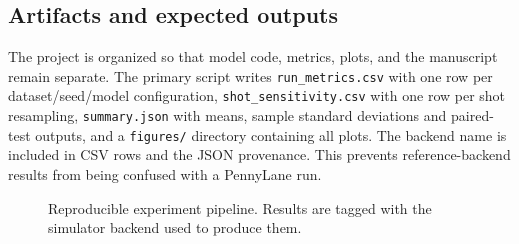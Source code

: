 \subsection{Artifacts and expected outputs}
The project is organized so that model code, metrics, plots, and the manuscript remain separate. The primary script writes \texttt{run\_metrics.csv} with one row per dataset/seed/model configuration, \texttt{shot\_sensitivity.csv} with one row per shot resampling, \texttt{summary.json} with means, sample standard deviations and paired-test outputs, and a \texttt{figures/} directory containing all plots. The backend name is included in CSV rows and the JSON provenance. This prevents reference-backend results from being confused with a PennyLane run.

\begin{figure}[!htbp]
\centering
{}
\caption{Reproducible experiment pipeline. Results are tagged with the simulator backend used to produce them.}
\label{fig:pipeline}
\end{figure}

